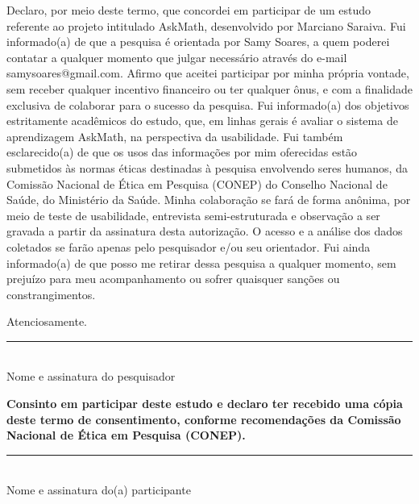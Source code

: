 \label{ap:tcle}

Declaro, por meio deste termo, que concordei em participar de um estudo referente ao projeto intitulado AskMath, desenvolvido por Marciano Saraiva. Fui informado(a) de que a pesquisa é orientada por Samy Soares, a quem poderei contatar a qualquer momento que julgar necessário através do e-mail samysoares@gmail.com. Afirmo que aceitei participar por minha própria vontade, sem receber qualquer incentivo financeiro ou ter qualquer ônus, e com a finalidade exclusiva de colaborar para o sucesso da pesquisa. Fui informado(a) dos objetivos estritamente acadêmicos do estudo, que, em linhas gerais é avaliar o sistema de aprendizagem AskMath, na perspectiva da usabilidade. Fui também esclarecido(a) de que os usos das informações por mim oferecidas estão submetidos às normas éticas destinadas à pesquisa envolvendo seres humanos, da Comissão Nacional de Ética em Pesquisa (CONEP) do Conselho Nacional de Saúde, do Ministério da Saúde. Minha colaboração se fará de forma anônima, por meio de teste de usabilidade, entrevista semi-estruturada e observação a ser gravada a partir da assinatura desta autorização. O acesso e a análise dos dados coletados se farão apenas pelo pesquisador e/ou seu orientador. Fui ainda informado(a) de que posso me retirar dessa pesquisa a qualquer momento, sem prejuízo para meu acompanhamento ou sofrer quaisquer sanções ou constrangimentos. 

\begin{center}
	Atenciosamente.
\end{center}

\begin{center}
\noindent\rule{10cm}{0.4pt}\\
Nome e assinatura do pesquisador
\end{center}

\textbf{Consinto em participar deste estudo e declaro ter recebido uma cópia deste termo de consentimento, conforme recomendações da Comissão Nacional de Ética em Pesquisa (CONEP).}

\begin{center}
\noindent\rule{10cm}{0.4pt}\\
 Nome e assinatura do(a) participante
\end{center}
